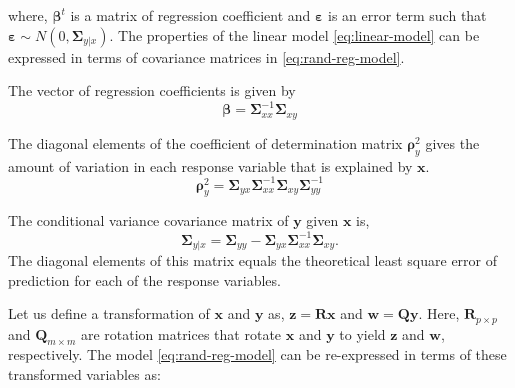 \documentclass[3p,times,12pt,authoryear]{elsarticle}
\providecommand{\tightlist}{%
  \setlength{\itemsep}{0pt}\setlength{\parskip}{0pt}}
\theoremstyle{definition}
\theoremstyle{definition}
\theoremstyle{remark}
\begin{document}
where, \(\boldsymbol{\beta}^t\) is a matrix of regression coefficient
and \(\boldsymbol{\varepsilon}\) is an error term such that
\(\boldsymbol{\varepsilon} \sim N\left(0, \boldsymbol{\Sigma}_{y|x}\right)\).
The properties of the linear model \eqref{eq:linear-model} can be
expressed in terms of covariance matrices in \eqref{eq:rand-reg-model}.

\begin{description}
\tightlist
\item[Regression Coefficients]
The vector of regression coefficients is given by
\[ \boldsymbol{\beta} = \boldsymbol{\Sigma}_{xx}^{-1}\boldsymbol{\Sigma}_{xy}\]
\item[Coefficient of Determination]
The diagonal elements of the coefficient of determination matrix
\(\boldsymbol{\rho}_y^2\) gives the amount of variation in each response
variable that is explained by \(\mathbf{x}\).
\[\boldsymbol{\rho}_y^2 = \boldsymbol{\Sigma}_{yx}\boldsymbol{\Sigma}_{xx}^{-1}\boldsymbol{\Sigma}_{xy}\boldsymbol{\Sigma}_{yy}^{-1}\]
\item[Conditional variance]
The conditional variance covariance matrix of \(\mathbf{y}\) given
\(\mathbf{x}\) is,
\[\boldsymbol{\Sigma}_{y|x} = \boldsymbol{\Sigma}_{yy} - \boldsymbol{\Sigma}_{yx}\boldsymbol{\Sigma}_{xx}^{-1}\boldsymbol{\Sigma}_{xy}.\]
The diagonal elements of this matrix equals the theoretical least square
error of prediction for each of the response variables.
\end{description}

Let us define a transformation of \(\mathbf{x}\) and \(\mathbf{y}\) as,
\(\mathbf{z} = \mathbf{Rx}\) and \(\mathbf{w} = \mathbf{Qy}\). Here,
\(\mathbf{R}_{p\times p}\) and \(\mathbf{Q}_{m\times m}\) are rotation
matrices that rotate \(\mathbf{x}\) and \(\mathbf{y}\) to yield
\(\mathbf{z}\) and \(\mathbf{w}\), respectively. The model
\eqref{eq:rand-reg-model} can be re-expressed in terms of these
transformed variables as:
\end{document}
